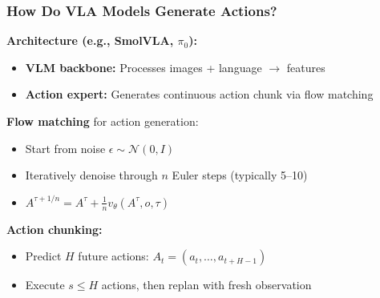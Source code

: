 \documentclass[aspectratio=1610]{beamer}
\begin{document}
\begin{frame}
\frametitle{How Do VLA Models Generate Actions?}

\textbf{Architecture (e.g., SmolVLA, $\pi_0$):}
\begin{itemize}
    \item \textbf{VLM backbone:} Processes images + language $\rightarrow$ features
    \item \textbf{Action expert:} Generates continuous action chunk via flow matching
\end{itemize}

\vspace{0.3em}
\textbf{Flow matching} for action generation:
\begin{itemize}
    \item Start from noise $\epsilon \sim \mathcal{N}(0, I)$
    \item Iteratively denoise through $n$ Euler steps (typically 5--10)
    \item $A^{\tau + 1/n} = A^{\tau} + \frac{1}{n} v_\theta(A^{\tau}, o, \tau)$
\end{itemize}

\vspace{0.3em}
\textbf{Action chunking:}
\begin{itemize}
    \item Predict $H$ future actions: $A_t = (a_t, \ldots, a_{t+H-1})$
    \item Execute $s \leq H$ actions, then replan with fresh observation
\end{itemize}

\end{frame}
\end{document}
